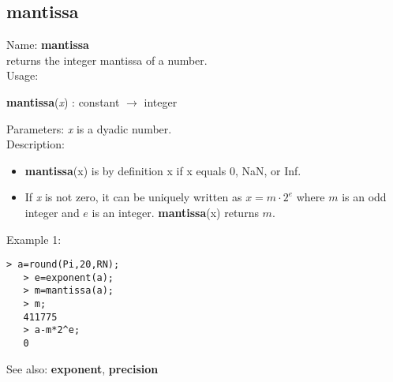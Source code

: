 \subsection{ mantissa }
\noindent Name: \textbf{mantissa}\\
returns the integer mantissa of a number.\\

\noindent Usage: 
\begin{center}
\textbf{mantissa}(\emph{x}) : \textsf{constant} $\rightarrow$ \textsf{integer}\\
\end{center}
Parameters: 
\emph{x} is a dyadic number.\\

\noindent Description: \begin{itemize}

\item \textbf{mantissa}(x) is by definition x if x equals 0, NaN, or Inf.

\item If \emph{x} is not zero, it can be uniquely written as $x = m \cdot 2^e$ where
   $m$ is an odd integer and $e$ is an integer. \textbf{mantissa}(x) returns $m$. 
\end{itemize}
\noindent Example 1: 
\begin{center}\begin{minipage}{14.8cm}\begin{Verbatim}[frame=single]
   > a=round(Pi,20,RN);
   > e=exponent(a);
   > m=mantissa(a);
   > m;
   411775
   > a-m*2^e;
   0
\end{Verbatim}
\end{minipage}\end{center}
See also: \textbf{exponent}, \textbf{precision}

